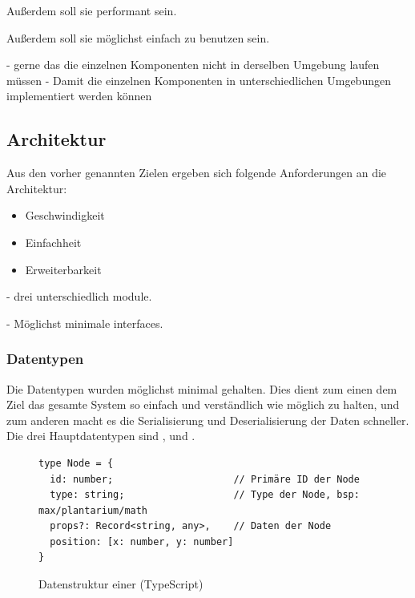 \documentclass[ngerman]{article}
\begin{document}
Außerdem soll sie performant sein.

Außerdem soll sie möglichst einfach zu benutzen sein.


- gerne das die einzelnen Komponenten nicht in derselben Umgebung laufen müssen
- Damit die einzelnen Komponenten in unterschiedlichen Umgebungen implementiert werden können

\subsection{Architektur}

Aus den vorher genannten Zielen ergeben sich folgende Anforderungen an die Architektur:

\begin{itemize}
  \item Geschwindigkeit
  \item Einfachheit
  \item Erweiterbarkeit
\end{itemize}

- drei unterschiedlich module. 

- Möglichst minimale interfaces. 

\subsubsection{Datentypen}

Die Datentypen wurden möglichst minimal gehalten. Dies dient zum einen dem Ziel das gesamte System so einfach und verständlich wie möglich zu halten, und zum
anderen macht es die Serialisierung und Deserialisierung der Daten schneller.
\linebreak
\linebreak
Die drei Hauptdatentypen sind ,  und . 

\begin{figure}[htbp]
  \begin{code}
    \begin{verbatim}
type Node = {
  id: number;                     // Primäre ID der Node
  type: string;                   // Type der Node, bsp: max/plantarium/math
  props?: Record<string, any>,    // Daten der Node
  position: [x: number, y: number]
}
    \end{verbatim}
  \end{code}

  \caption{Datenstruktur einer  (TypeScript)}
  \label{fig:data_node}

\end{figure}
\end{document}
